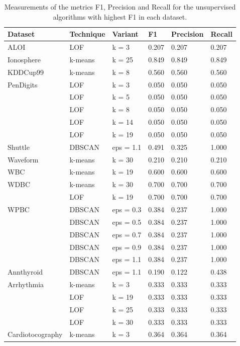 \begin{table}[!ht]
	\centering
	\caption{Measurements of the metrics F1, Precision and Recall for the unsupervised algorithms with highest F1 in each dataset.}
	\label{tab:best_algs_un}
	\begin{tabular}{@{}llllll@{}}
		\toprule
		\textbf{Dataset} & \textbf{Technique} & \textbf{Variant} & \textbf{F1} & \textbf{Precision} & \textbf{Recall} \\ \midrule
		ALOI & LOF & k = 3 & 0.207 & 0.207 & 0.207 \\
		Ionosphere & k-means & k = 25 & 0.849 & 0.849 & 0.849 \\
		KDDCup99 & k-means & k = 8 & 0.560 & 0.560 & 0.560 \\
		PenDigits & LOF & k = 3 & 0.050 & 0.050 & 0.050 \\
		& LOF & k = 5 & 0.050 & 0.050 & 0.050 \\
		& LOF & k = 8 & 0.050 & 0.050 & 0.050 \\
		& LOF & k = 14 & 0.050 & 0.050 & 0.050 \\
		& LOF & k = 19 & 0.050 & 0.050 & 0.050 \\
		Shuttle & DBSCAN & eps = 1.1 & 0.491 & 0.325 & 1.000 \\
		Waveform & k-means & k = 30 & 0.210 & 0.210 & 0.210 \\
		WBC & k-means & k = 19 & 0.600 & 0.600 & 0.600 \\
		WDBC & k-means & k = 30 & 0.700 & 0.700 & 0.700 \\
		& LOF & k = 19 & 0.700 & 0.700 & 0.700 \\
		WPBC & DBSCAN & eps = 0.3 & 0.384 & 0.237 & 1.000 \\
		& DBSCAN & eps = 0.5 & 0.384 & 0.237 & 1.000 \\
		& DBSCAN & eps = 0.7 & 0.384 & 0.237 & 1.000 \\
		& DBSCAN & eps = 0.9 & 0.384 & 0.237 & 1.000 \\
		& DBSCAN & eps = 1.1 & 0.384 & 0.237 & 1.000 \\
		Annthyroid & DBSCAN & eps = 1.1 & 0.190 & 0.122 & 0.438 \\
		Arrhythmia & k-means & k = 3 & 0.333 & 0.333 & 0.333 \\
		& LOF & k = 19 & 0.333 & 0.333 & 0.333 \\
		& LOF & k = 25 & 0.333 & 0.333 & 0.333 \\
		& LOF & k = 30 & 0.333 & 0.333 & 0.333 \\
		Cardiotocography & k-means & k = 3 & 0.364 & 0.364 & 0.364 \\

\end{tabular}
\end{table}
